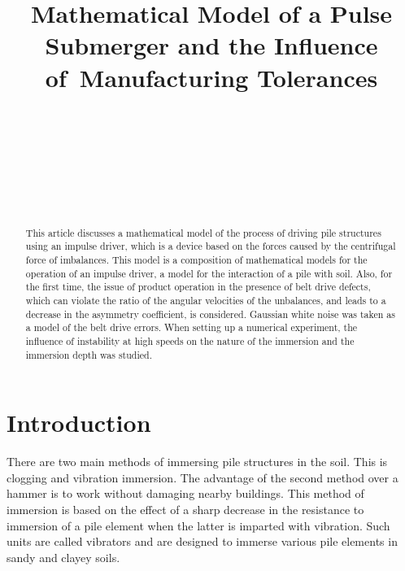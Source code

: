 \documentclass[
11pt,%
tightenlines,%
twoside,%
onecolumn,%
nofloats,%
nobibnotes,%
nofootinbib,%
superscriptaddress,%
noshowpacs,%
centertags]%
{revtex4}
\begin{document}


\title{Mathematical Model of a Pulse Submerger and the Influence of~Manufacturing Tolerances}

\author{~}
 
\author{~}
 
\author{~}
 
\author{~}%




\begin{abstract}
This article discusses a mathematical model of the process  of
driving pile structures using an impulse driver, which is a device
based on the forces caused by the centrifugal force of imbalances.
This model is a composition of mathematical models for the operation
of an impulse driver, a model for the interaction of a pile with
soil. Also, for the first time, the issue of product operation in
the presence of belt drive defects, which can violate the ratio of
the angular velocities of the unbalances, and leads to a decrease in
the asymmetry coefficient, is considered. Gaussian white noise was
taken as a model of the belt drive errors. When setting up a
numerical experiment, the influence of instability at high speeds on
the nature of the immersion and the immersion depth was studied.
\end{abstract}

  \maketitle

\section{Introduction}
There are two main methods of immersing pile structures in the soil.
This is clogging and vibration immersion. The advantage of the
second method over a hammer is to work without damaging nearby
buildings. This method of immersion is based on the effect of a
sharp decrease in the resistance to immersion of a pile element when
the latter is imparted with vibration. Such units are called
vibrators and are designed to immerse various pile elements in sandy
and clayey soils.
\end{document}
